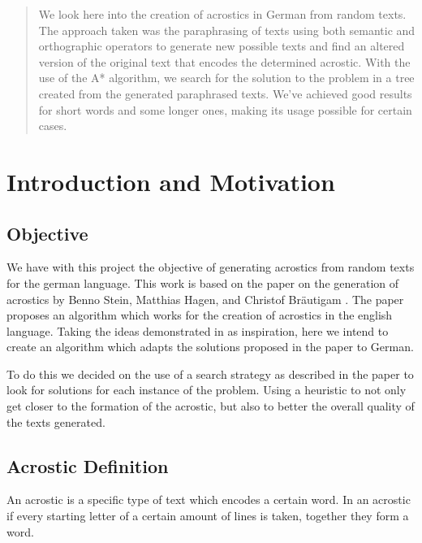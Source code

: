 \documentclass[11pt]{reportAlternative}
\begin{document}
\begin{abstract}
We look here into the creation of acrostics in German from random texts. The approach taken was the paraphrasing of texts using both semantic and orthographic operators to generate new possible texts and find an altered version of the original text that encodes the determined acrostic. With the use of the A* algorithm, we search for the solution to the problem in a tree created from the generated paraphrased texts. We've achieved good results for short words and some longer ones, making its usage possible for certain cases.
\end{abstract}

\chapter{Introduction and Motivation}
\section{Objective}
We have with this project the objective of generating acrostics from random texts for the german language. This work is based on the paper on the generation of acrostics by Benno Stein, Matthias Hagen, and Christof Bräutigam \cite{Stein}. The paper proposes an algorithm which works for the creation of acrostics in the english language. Taking the ideas demonstrated in \cite{Stein} as inspiration, here we intend to create an algorithm which adapts the solutions proposed in the paper to German. 

To do this we decided on the use of a search strategy as described in the paper to look for solutions for each instance of the problem. Using a heuristic to not only get closer to the formation of the acrostic, but also to better the overall quality of the texts generated.

\section{Acrostic Definition}
An acrostic is a specific type of text which encodes a certain word. In an acrostic if every starting letter of a certain amount of lines is taken, together they form a word.
\end{document}
